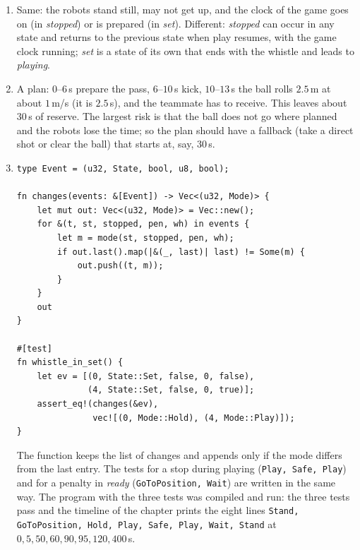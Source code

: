 \begin{enumerate}[label=\textbf{\ansnum.\arabic*}]
  \item Same: the robots stand still, may not get up, and the clock of the game goes on (in \emph{stopped}) or is prepared (in \emph{set}). Different: \emph{stopped} can occur in any state and returns to the previous state when play resumes, with the game clock running; \emph{set} is a state of its own that ends with the whistle and leads to \emph{playing}.
  \item A plan: $0$--$6$\,s prepare the pass, $6$--$10$\,s kick, $10$--$13$\,s the ball rolls $2.5$\,m at about $1$\,m/s (it is $2.5$\,s), and the teammate has to receive. This leaves about $30$\,s of reserve. The largest risk is that the ball does not go where planned and the robots lose the time; so the plan should have a fallback (take a direct shot or clear the ball) that starts at, say, $30$\,s.
  \item
\begin{verbatim}
type Event = (u32, State, bool, u8, bool);

fn changes(events: &[Event]) -> Vec<(u32, Mode)> {
    let mut out: Vec<(u32, Mode)> = Vec::new();
    for &(t, st, stopped, pen, wh) in events {
        let m = mode(st, stopped, pen, wh);
        if out.last().map(|&(_, last)| last) != Some(m) {
            out.push((t, m));
        }
    }
    out
}

#[test]
fn whistle_in_set() {
    let ev = [(0, State::Set, false, 0, false),
              (4, State::Set, false, 0, true)];
    assert_eq!(changes(&ev),
               vec![(0, Mode::Hold), (4, Mode::Play)]);
}
\end{verbatim}
  The function keeps the list of changes and appends only if the mode differs from the last entry. The tests for a stop during playing (\texttt{Play, Safe, Play}) and for a penalty in \emph{ready} (\texttt{GoToPosition, Wait}) are written in the same way. The program with the three tests was compiled and run: the three tests pass and the timeline of the chapter prints the eight lines \texttt{Stand, GoToPosition, Hold, Play, Safe, Play, Wait, Stand} at $0, 5, 50, 60, 90, 95, 120, 400$\,s.
\end{enumerate}
